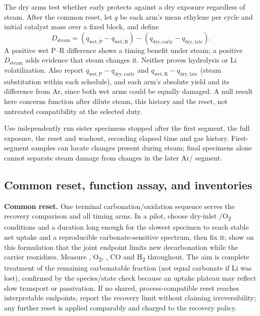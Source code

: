 The dry arms test whether early \COtwo{} protects against a dry exposure regardless of steam. After the common reset, let $q$ be each arm's mean ethylene per cycle and initial catalyst mass over a fixed block, and define
\begin{equation}
 D_{\mathrm{steam}}=(q_{\mathrm{wet,P}}-q_{\mathrm{wet,R}})
 -(q_{\mathrm{dry,early}}-q_{\mathrm{dry,late}}).
 \label{eq:cyclic-interaction}
\end{equation}
A positive wet P--R difference shows a timing benefit under steam; a positive $D_{\mathrm{steam}}$ adds evidence that steam changes it. Neither proves hydrolysis or Li volatilization. Also report $q_{\mathrm{wet,P}}-q_{\mathrm{dry,early}}$ and $q_{\mathrm{wet,R}}-q_{\mathrm{dry,late}}$ (steam substitution within each \COtwo{} schedule), and each arm's absolute yield and its difference from Ar, since both wet arms could be equally damaged. A null result here concerns function after dilute steam, this \COtwo{} history and the reset, not untreated compatibility at the selected duty.

Use independently run sister specimens stopped after the first segment, the full exposure, the reset and washout, recording elapsed time and gas history. First-segment samples can locate changes present during steam; final specimens alone cannot separate steam damage from changes in the later Ar/\COtwo{} segment.

\subsection{Common reset, function assay, and inventories}

\textbf{Common reset.} One terminal carbonation/oxidation sequence serves the recovery comparison and all timing arms. In a pilot, choose dry-inlet \COtwo{}/O\textsubscript{2} conditions and a duration long enough for the slowest specimen to reach stable net uptake and a reproducible carbonate-sensitive spectrum, then fix it; show on this formulation that the joint endpoint limits new decarbonation while the carrier reoxidizes. Measure \COtwo{}, O\textsubscript{2}, \HtwoO{}, CO and H\textsubscript{2} throughout. The aim is complete treatment of the remaining carbonatable fraction (not equal carbonate if Li was lost), confirmed by the species/state check because an uptake plateau may reflect slow transport or passivation. If no shared, process-compatible reset reaches interpretable endpoints, report the recovery limit without claiming irreversibility; any further reset is applied comparably and charged to the recovery policy.

